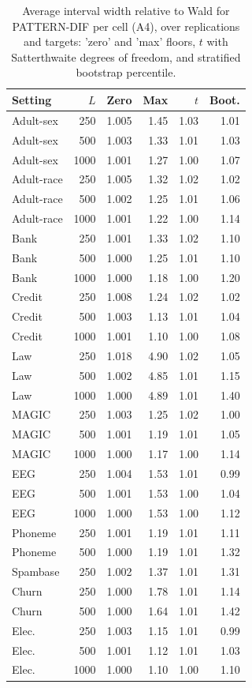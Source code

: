 \documentclass[pdflatex,sn-mathphys-num,iicol]{sn-jnl}
\theoremstyle{thmstyleone}
\theoremstyle{thmstyletwo}
\theoremstyle{thmstylethree}
\begin{document}
\begin{table}[t]
\centering\scriptsize
\caption{Average interval width relative to Wald for PATTERN-DIF per cell (A4), over replications and targets: 'zero' and 'max' floors, $t$ with Satterthwaite degrees of freedom, and stratified bootstrap percentile.}
\label{tab:abl-app-width}
\setlength{\tabcolsep}{6pt}
\begin{tabular}{lrrrrr}
\toprule
Setting & $L$ & Zero & Max & $t$ & Boot. \\
\midrule
Adult-sex & 250 & 1.005 & 1.45 & 1.03 & 1.01 \\
Adult-sex & 500 & 1.003 & 1.33 & 1.01 & 1.03 \\
Adult-sex & 1000 & 1.001 & 1.27 & 1.00 & 1.07 \\
Adult-race & 250 & 1.005 & 1.32 & 1.02 & 1.02 \\
Adult-race & 500 & 1.002 & 1.25 & 1.01 & 1.06 \\
Adult-race & 1000 & 1.001 & 1.22 & 1.00 & 1.14 \\
Bank & 250 & 1.001 & 1.33 & 1.02 & 1.10 \\
Bank & 500 & 1.000 & 1.25 & 1.01 & 1.10 \\
Bank & 1000 & 1.000 & 1.18 & 1.00 & 1.20 \\
Credit & 250 & 1.008 & 1.24 & 1.02 & 1.02 \\
Credit & 500 & 1.003 & 1.13 & 1.01 & 1.04 \\
Credit & 1000 & 1.001 & 1.10 & 1.00 & 1.08 \\
Law & 250 & 1.018 & 4.90 & 1.02 & 1.05 \\
Law & 500 & 1.002 & 4.85 & 1.01 & 1.15 \\
Law & 1000 & 1.000 & 4.89 & 1.01 & 1.40 \\
MAGIC & 250 & 1.003 & 1.25 & 1.02 & 1.00 \\
MAGIC & 500 & 1.001 & 1.19 & 1.01 & 1.05 \\
MAGIC & 1000 & 1.000 & 1.17 & 1.00 & 1.14 \\
EEG & 250 & 1.004 & 1.53 & 1.01 & 0.99 \\
EEG & 500 & 1.001 & 1.53 & 1.00 & 1.04 \\
EEG & 1000 & 1.000 & 1.53 & 1.00 & 1.12 \\
Phoneme & 250 & 1.001 & 1.19 & 1.01 & 1.11 \\
Phoneme & 500 & 1.000 & 1.19 & 1.01 & 1.32 \\
Spambase & 250 & 1.002 & 1.37 & 1.01 & 1.31 \\
Churn & 250 & 1.000 & 1.78 & 1.01 & 1.14 \\
Churn & 500 & 1.000 & 1.64 & 1.01 & 1.42 \\
Elec. & 250 & 1.003 & 1.15 & 1.01 & 0.99 \\
Elec. & 500 & 1.001 & 1.12 & 1.01 & 1.03 \\
Elec. & 1000 & 1.000 & 1.10 & 1.00 & 1.10 \\
\bottomrule
\end{tabular}

\end{table}
\end{document}
